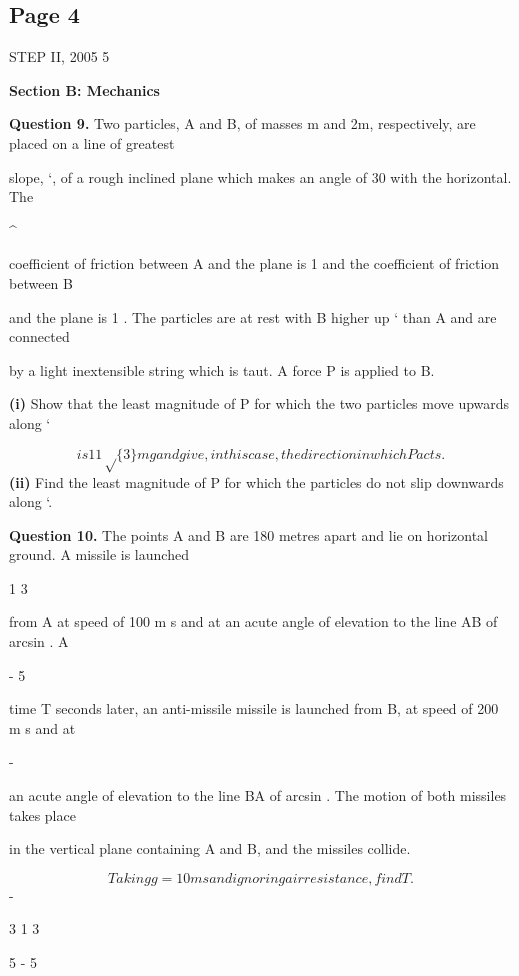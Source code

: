 \documentclass[12pt]{article}
\begin{document}
\subsection*{Page 4}
\begin{flushleft}
STEP II, 2005 5\par
\bigskip\textbf{Section B: Mechanics}\par
\bigskip\textbf{Question 9.} Two particles, A and B, of masses m and 2m, respectively, are placed on a line of greatest\par
slope, `, of a rough inclined plane which makes an angle of 30 with the horizontal. The\par
\textasciicircum{}\circ\par
coefficient of friction between A and the plane is 1  and the coefficient of friction between B\par
and the plane is 1 . The particles are at rest with B higher up ` than A and are connected\par
by a light inextensible string which is taut. A force P is applied to B.\par
\textbf{(i)} Show that the least magnitude of P for which the two particles move upwards along `\par
\[is 11 \sqrt\{3\} mg and give, in this case, the direction in which P acts.\]
\textbf{(ii)} Find the least magnitude of P for which the particles do not slip downwards along `.\par
\bigskip\textbf{Question 10.} The points A and B are 180 metres apart and lie on horizontal ground. A missile is launched\par
1 3\par
from A at speed of 100 m s and at an acute angle of elevation to the line AB of arcsin . A\par
- 5\par
time T seconds later, an anti-missile missile is launched from B, at speed of 200 m s and at\par
-\par
an acute angle of elevation to the line BA of arcsin . The motion of both missiles takes place\par
in the vertical plane containing A and B, and the missiles collide.\par
\[Taking g = 10 m s and ignoring air resistance, find T .\]
-\par
3 1 3\par
[Note that arcsin is another notation for sin .]\par
5 - 5\par

\end{flushleft}
\end{document}
